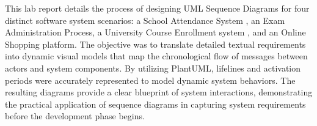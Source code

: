 This lab report details the process of designing UML Sequence Diagrams for four distinct software system scenarios: a School Attendance System , an Exam Administration Process, a University Course Enrollment system , and an Online Shopping platform. The objective was to translate detailed textual requirements into dynamic visual models that map the chronological flow of messages between actors and system components. By utilizing PlantUML, lifelines and activation periods were accurately represented to model dynamic system behaviors. The resulting diagrams provide a clear blueprint of system interactions, demonstrating the practical application of sequence diagrams in capturing system requirements before the development phase begins.
\endinput
